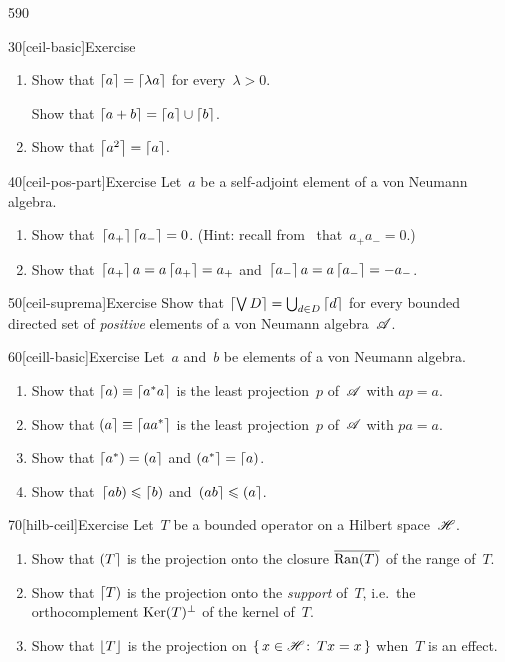 \begin{parsec}{590}
\begin{point}{30}[ceil-basic]{Exercise}
\begin{enumerate}
\item
Show that $\left\lceil a\right\rceil=\left\lceil\lambda a\right\rceil$
for every~$\lambda>0$.

Show that $\left\lceil a+b\right\rceil=\left\lceil a\right\rceil\cup\left\lceil b\right\rceil$.
\item
Show that $\left\lceil a^2\right\rceil=\left\lceil a\right\rceil$.
\end{enumerate}
\end{point}
\begin{point}{40}[ceil-pos-part]{Exercise}%
Let~$a$ be a self-adjoint element of a von Neumann algebra.
\begin{enumerate}
\item
Show that~$\left\lceil a_+\right\rceil\left\lceil a_-\right\rceil= 0$.
(Hint: recall from~ that~$a_+a_-=0$.)
\item
	Show that~$\left\lceil a_+\right\rceil a = a\left\lceil a_+\right\rceil = a_+$
	and~$\left\lceil a_-\right\rceil a=a\left\lceil a_-\right\rceil = -a_-$.
\end{enumerate}
\end{point}
\begin{point}{50}[ceil-suprema]{Exercise}%
Show that $\left\lceil\bigvee D\right\rceil = \bigcup_{d\in D}\left\lceil d\right\rceil$
for every bounded directed set of \emph{positive}
elements of a von Neumann algebra~$\mathscr{A}$.
\end{point}
\begin{point}{60}[ceill-basic]{Exercise}%
Let~$a$ and~$b$  be elements of a von Neumann algebra.
\begin{enumerate}
\item
Show that $\left\lceil a\right)\equiv \left\lceil a^*a\right\rceil$
is the least projection~$p$ of~$\mathscr{A}$
with $ap =a$.

\item
Show that $\left(a\right\rceil\equiv \left\lceil aa^*\right\rceil$
is the least projection~$p$ of~$\mathscr{A}$
with $pa=a$.

\item
Show that $\left\lceil a^*\right)=\left(a\right\rceil$
and $\left(a^*\right\rceil=\left\lceil a\right)$.

\item
Show that~$\left\lceil ab\right)\leqslant\left\lceil b\right)$
and~$\left(ab\right\rceil\leqslant\left(a\right\rceil$.
\end{enumerate}
\end{point}
\begin{point}{70}[hilb-ceil]{Exercise}%
Let~$T$ be a bounded operator on a Hilbert space~$\mathscr{H}$.
\begin{enumerate}
\item
Show that $\left(T\right\rceil$
is the projection onto the closure
$\overline{\operatorname{Ran}(T)}$ of the range of~$T$.
\item
Show that $\left\lceil T\right)$
is the projection onto the \emph{support}
of~$T$, i.e.~the orthocomplement
$\operatorname{Ker}(T)^\perp$ of the kernel of~$T$.
\item
Show that $\left\lfloor T\right\rfloor$ is the projection
on $\{\,x\in\mathscr{H}\colon\, Tx=x\,\}$
when~$T$ is an effect.
\end{enumerate}
\end{point}
\end{parsec}
